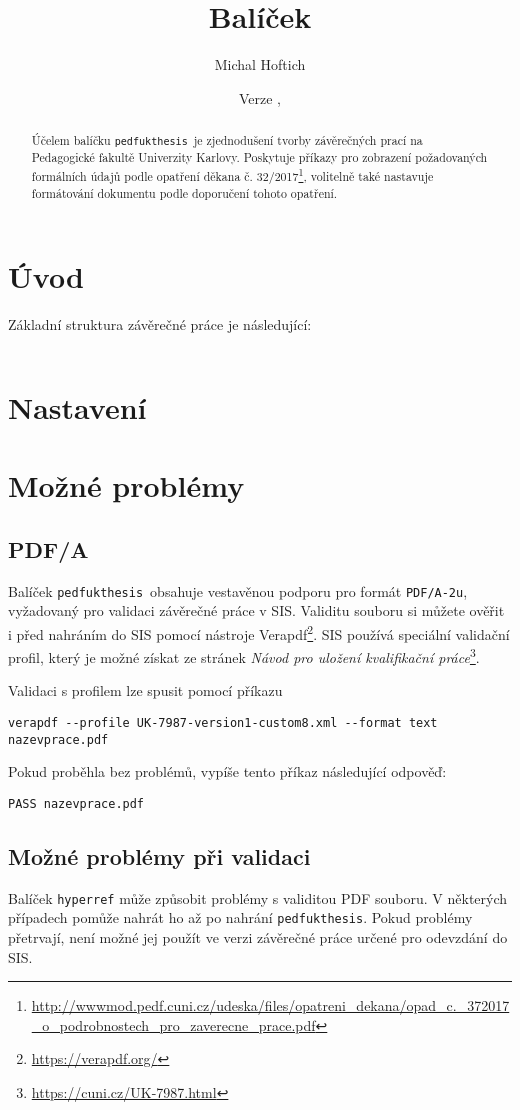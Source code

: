\documentclass{ltxdoc}
\title{Balíček \pkgname}
\author{Michal Hoftich}
\date{Verze \version, \gitdate}
\newcommand\pkgname{\texttt{pedfukthesis}}
\begin{document}
\maketitle

\begin{abstract}
\noindent Účelem balíčku \pkgname\ je zjednodušení tvorby závěrečných prací na
Pedagogické fakultě Univerzity Karlovy. Poskytuje příkazy pro zobrazení
požadovaných formálních údajů podle opatření děkana č.
32/2017\footnote{\url{http://wwwmod.pedf.cuni.cz/udeska/files/opatreni_dekana/opad_c._372017_o_podrobnostech_pro_zaverecne_prace.pdf}},
volitelně také nastavuje formátování dokumentu podle doporučení tohoto
opatření.
\end{abstract}

\tableofcontents

\section{Úvod}

Základní struktura závěrečné práce je následující:

\inputminted{latex}{example/basic.tex}

\section{Nastavení}

\section{Možné problémy}
\subsection{PDF/A}
Balíček \pkgname\ obsahuje vestavěnou podporu pro formát \texttt{PDF/A-2u},
vyžadovaný pro validaci závěrečné práce v SIS. Validitu souboru si můžete
ověřit i před nahráním do SIS pomocí nástroje
Verapdf\footnote{\url{https://verapdf.org/}}. SIS používá speciální validační
profil, který je možné získat ze stránek
\textit{Návod pro uložení kvalifikační práce}\footnote{\url{https://cuni.cz/UK-7987.html}}.

Validaci s profilem lze spusit pomocí příkazu

\begin{verbatim}
verapdf --profile UK-7987-version1-custom8.xml --format text nazevprace.pdf
\end{verbatim}

Pokud proběhla bez problémů, vypíše tento příkaz následující odpověď:

\begin{verbatim}
PASS nazevprace.pdf
\end{verbatim}

\subsection{Možné problémy při validaci}

Balíček \texttt{hyperref} může způsobit problémy s validitou PDF souboru. V některých případech
pomůže nahrát ho až po nahrání \pkgname. Pokud problémy přetrvají, není možné
jej použít ve verzi závěrečné práce určené pro odevzdání do SIS.
\end{document}
